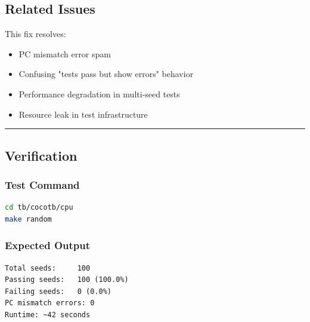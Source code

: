 \subsection{Related Issues}\label{cr:fix:pc-mismatch-fix:related-issues}

\begin{record}

This fix resolves:

\begin{itemize}
\tightlist
\item
  \ok{} PC mismatch error spam
\item
  \ok{} Confusing "tests pass but show errors" behavior
\item
  \ok{} Performance degradation in multi-seed tests
\item
  \ok{} Resource leak in test infrastructure
\end{itemize}

\begin{center}\rule{0.5\linewidth}{0.5pt}\end{center}

\end{record}

\subsection{Verification}\label{cr:fix:pc-mismatch-fix:verification}

\subsubsection{Test Command}\label{cr:fix:pc-mismatch-fix:test-command}

\begin{record}

\begin{lstlisting}[language=bash]
cd tb/cocotb/cpu
make random
\end{lstlisting}

\end{record}

\subsubsection{Expected Output}\label{cr:fix:pc-mismatch-fix:expected-output}

\begin{record}

\begin{lstlisting}[language={}]
Total seeds:     100
Passing seeds:   100 (100.0%)
Failing seeds:   0 (0.0%)
PC mismatch errors: 0
Runtime: ~42 seconds
\end{lstlisting}

\end{record}

